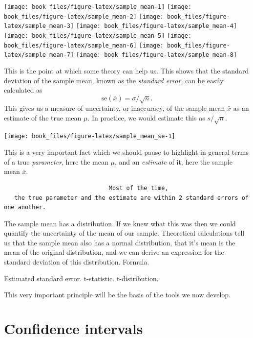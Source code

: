 \documentclass[
]{book}
\begin{document}
\texttt{[image: book\_files/figure-latex/sample\_mean-1]} \texttt{[image: book\_files/figure-latex/sample\_mean-2]} \texttt{[image: book\_files/figure-latex/sample\_mean-3]} \texttt{[image: book\_files/figure-latex/sample\_mean-4]} \texttt{[image: book\_files/figure-latex/sample\_mean-5]} \texttt{[image: book\_files/figure-latex/sample\_mean-6]} \texttt{[image: book\_files/figure-latex/sample\_mean-7]} \texttt{[image: book\_files/figure-latex/sample\_mean-8]}

This is the point at which some theory can help us. This shows that the standard deviation of the sample mean, known as the \emph{standard error}, can be easily calculated as
\[
   \mbox{se}(\bar{x}) =  \sigma / \sqrt{n} .
\]
This gives us a measure of uncertainty, or inaccuracy, of the sample mean \(\bar x\) as an estimate of the true mean \(\mu\). In practice, we would estimate this as \(s / \sqrt{n}\).

\begin{center}\texttt{[image: book\_files/figure-latex/sample\_mean\_se-1]} \end{center}

This is a very important fact which we should pause to highlight in general terms of a true \emph{parameter}, here the mean \(\mu\), and an \emph{estimate} of it, here the sample mean \(\bar x\).

\begin{verbatim}
                              Most of the time,
   the true parameter and the estimate are within 2 standard errors of one another.
\end{verbatim}

The sample mean has a distribution. If we knew what this was then we could quantify the uncertainty of the mean of our sample.
Theoretical calculations tell us that the sample mean also has a normal distribution, that it's mean is the mean of the original distribution, and we can derive an expression for the standard deviation of this distribution. Formula.

Estimated standard error. t-statistic. t-distribution.

This very important principle will be the basis of the tools we now develop.

\section{Confidence intervals}\label{confidence-intervals}
\end{document}

